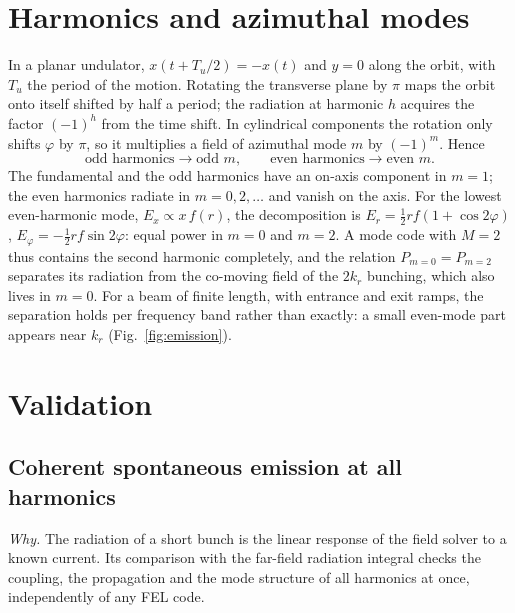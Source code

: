 \documentclass[aps,prab,reprint,floatfix,superscriptaddress,amsmath,amssymb]{revtex4-2}
\begin{document}
\section{Harmonics and azimuthal modes}\label{sec:modes}

In a planar undulator, $x(t + T_u/2) = -x(t)$ and $y = 0$ along the orbit, with $T_u$ the period of the motion. Rotating the transverse plane by $\pi$ maps the orbit onto itself shifted by half a period; the radiation at harmonic $h$ acquires the factor $(-1)^h$ from the time shift. In cylindrical components the rotation only shifts $\varphi$ by $\pi$, so it multiplies a field of azimuthal mode $m$ by $(-1)^m$. Hence
\begin{equation}
\text{odd harmonics} \to \text{odd } m, \qquad \text{even harmonics} \to \text{even } m .
\end{equation}
The fundamental and the odd harmonics have an on-axis component in $m = 1$; the even harmonics radiate in $m = 0, 2, \ldots$ and vanish on the axis. For the lowest even-harmonic mode, $E_x \propto x\,f(r)$, the decomposition is $E_r = \tfrac12 r f(1 + \cos 2\varphi)$, $E_\varphi = -\tfrac12 r f \sin 2\varphi$: equal power in $m = 0$ and $m = 2$. A mode code with $M = 2$ thus contains the second harmonic completely, and the relation $P_{m=0} = P_{m=2}$ separates its radiation from the co-moving field of the $2k_r$ bunching, which also lives in $m = 0$. For a beam of finite length, with entrance and exit ramps, the separation holds per frequency band rather than exactly: a small even-mode part appears near $k_r$ (Fig.~\ref{fig:emission}).

\section{Validation}\label{sec:valid}

\subsection{Coherent spontaneous emission at all harmonics}\label{sec:emission}

\emph{Why.} The radiation of a short bunch is the linear response of the field solver to a known current. Its comparison with the far-field radiation integral checks the coupling, the propagation and the mode structure of all harmonics at once, independently of any FEL code.
\end{document}
